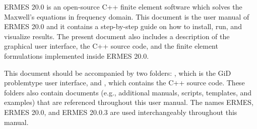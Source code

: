 %
%

ERMES 20.0 is an open-source C++ finite element software which solves the Maxwell's equations in frequency domain. This document is the user manual of ERMES 20.0 and it contains a step-by-step guide on how to install, run, and visualize results. The present document also includes a description of the graphical user interface, the C++ source code, and the finite element formulations implemented inside ERMES 20.0.

This document should be accompanied by two folders: , which is the GiD problemtype user interface, and , which contains the C++ source code. These folders also contain documents (e.g., additional manuals, scripts, templates, and examples) that are referenced throughout this user manual. The names ERMES, ERMES 20.0, and ERMES 20.0.3 are used interchangeably throughout this manual.








